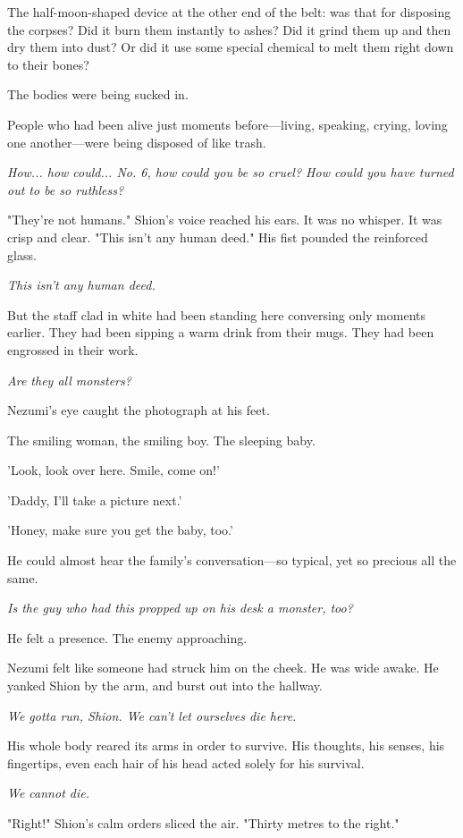 The half-moon-shaped device at the other end of the belt: was that for
disposing the corpses? Did it burn them instantly to ashes? Did it grind
them up and then dry them into dust? Or did it use some special chemical
to melt them right down to their bones?

The bodies were being sucked in.

People who had been alive just moments before---living, speaking, crying,
loving one another---were being disposed of like trash.

\emph{How... how could... No. 6, how could you be so cruel? How could you have
turned out to be so ruthless?}

"They're not humans." Shion's voice reached his ears. It was no whisper.
It was crisp and clear. "This isn't any human deed." His fist pounded
the reinforced glass.

\emph{This isn't any human deed.}

But the staff clad in white had been standing here conversing only
moments earlier. They had been sipping a warm drink from their mugs.
They had been engrossed in their work.

\emph{Are they all monsters?}

Nezumi's eye caught the photograph at his feet.

The smiling woman, the smiling boy. The sleeping baby.

'Look, look over here. Smile, come on!'

'Daddy, I'll take a picture next.'

'Honey, make sure you get the baby, too.'

He could almost hear the family's conversation---so typical, yet so
precious all the same.

\emph{Is the guy who had this propped up on his desk a monster, too?}

He felt a presence. The enemy approaching.

Nezumi felt like someone had struck him on the cheek. He was wide awake.
He yanked Shion by the arm, and burst out into the hallway.

\emph{We gotta run, Shion. We can't let ourselves die here.}

His whole body reared its arms in order to survive. His thoughts, his
senses, his fingertips, even each hair of his head acted solely for his
survival.

\emph{We cannot die.}

"Right!" Shion's calm orders sliced the air. "Thirty metres to the
right."

